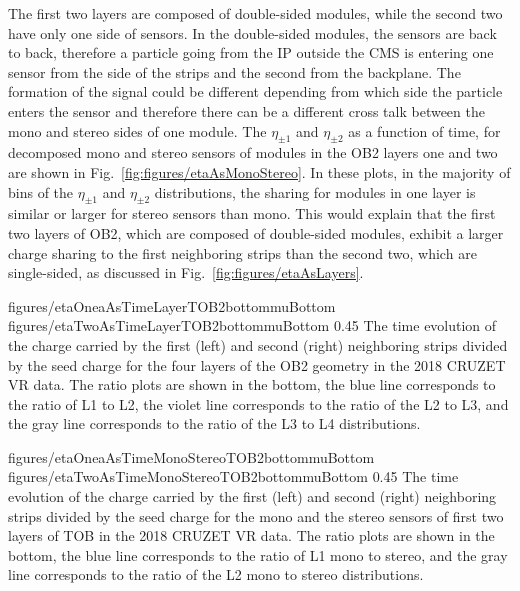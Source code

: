 The first two layers are composed of double-sided modules, while the second two have only one side of sensors. In the double-sided modules, the sensors are back to back, therefore a particle going from the IP outside the CMS is entering one sensor from the side of the strips and the second from the backplane. The formation of the signal could be different depending from which side the particle enters the sensor and therefore there can be a different cross talk between the mono and stereo sides of one module. The $\eta_{\pm 1}$ and $\eta_{\pm 2}$ as a function of time, for decomposed mono and stereo sensors of modules in the OB2 layers one and two are shown in Fig.~\ref{fig:figures/etaAsMonoStereo}. In these plots, in the majority of bins of the $\eta_{\pm 1}$ and $\eta_{\pm 2}$  distributions, the sharing for modules in one layer is similar or larger for stereo sensors than mono. This would explain that the first two layers of OB2, which are composed of double-sided modules, exhibit a larger charge sharing to the first neighboring strips than the second two, which are single-sided, as discussed in Fig.~\ref{fig:figures/etaAsLayers}. 



                 {figures/etaOneaAsTimeLayerTOB2bottommuBottom}
                 {figures/etaTwoAsTimeLayerTOB2bottommuBottom} %
                 {0.45}       %
                 { The time evolution of the charge carried by the first (left) and second (right) neighboring strips divided by the seed charge for the four layers of the OB2 geometry in the 2018 CRUZET VR data. The ratio plots are shown in the bottom, the blue line corresponds to the ratio of L1 to L2, the violet line corresponds to the ratio of the L2 to L3, and the gray line corresponds to the ratio of the L3 to L4 distributions. }


                 {figures/etaOneaAsTimeMonoStereoTOB2bottommuBottom}
                 {figures/etaTwoAsTimeMonoStereoTOB2bottommuBottom} %
                 {0.45}       %
                 { The time evolution of the charge carried by the first (left) and second (right) neighboring strips divided by the seed charge for the mono and the stereo sensors of first two layers of TOB in the 2018 CRUZET VR data. The ratio plots are shown in the bottom, the blue line corresponds to the ratio of L1 mono to stereo, and the gray line corresponds to the ratio of the L2 mono to stereo distributions. }


